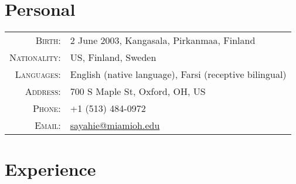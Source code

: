 \documentclass[a4paper,10pt]{article} %
\begin{document}
\pagestyle{empty} %


\par{\bigskip\par} %

\section{Personal}

\begin{tabular}{rl}
\textsc{Birth:} & 2 June 2003, Kangasala, Pirkanmaa, Finland \\
\textsc{Nationality:} & US, Finland, Sweden \\
\textsc{Languages:} & English (native language), Farsi (receptive bilingual)\\
\textsc{Address:} & 700 S Maple St, Oxford, OH, US \\
\textsc{Phone:} & +1 (513) 484-0972\\
\textsc{Email:} & \href{mailto:sayahie@miamioh.edu}{sayahie@miamioh.edu}\\
\end{tabular}


\section{Experience}
\end{document}
